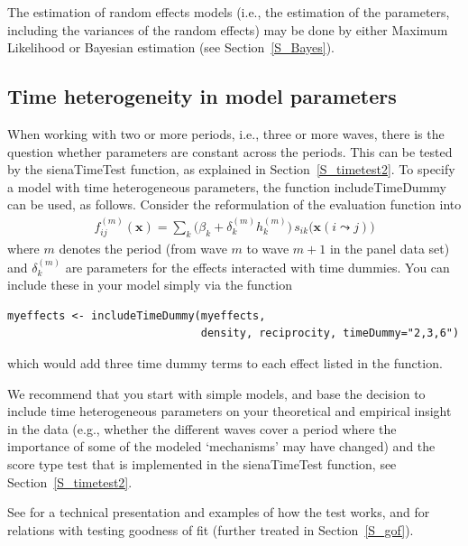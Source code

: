 \documentclass[a4paper,fleqn,11pt]{article}
\newcommand{\+}{\, + \,}
\newcommand{\sfn}[1]{\textsf{#1}}
\begin{document}
The estimation of random effects models
(i.e., the estimation of the parameters,
including the variances of the random effects)
may be done by either Maximum Likelihood
or Bayesian estimation (see Section~\ref{S_Bayes}).

\fi

\subsection{Time heterogeneity in model parameters}
\label{S_timetest1}

When working with two or more periods, i.e., three or more waves,
there is the question whether parameters are constant across the periods.
This can be tested by the \sfn{sienaTimeTest} function, as explained
in Section~\ref{S_timetest2}.
To specify a model with time heterogeneous parameters, the function
\sfn{includeTimeDummy} can be used, as follows.
Consider the reformulation of the evaluation function into
\begin{align}
f^{(m)}_{ij}(\mathbf{x})= \sum_k \Big(\beta_k + \delta_k^{(m)} h_k^{(m)}\Big)
                              \,      s_{ik}\big(\mathbf{x}(i \leadsto j)\big)
\label{eq:fmij}
\end{align}
where $m$ denotes the period (from wave $m$ to wave $m+1$
in the panel data set)
and $\delta_k^{(m)}$ are parameters for the effects interacted
with time dummies. You
can include these in your model simply via the function
\begin{verbatim}
myeffects <- includeTimeDummy(myeffects,
                              density, reciprocity, timeDummy="2,3,6")
\end{verbatim}
which would add three time dummy terms to each effect listed in the function.

We recommend that you start with simple models,
and base the decision to include time heterogeneous parameters
on your theoretical and empirical insight in the data
(e.g., whether the different waves cover a period where the importance
of some of the modeled `mechanisms' may have changed) and
the score type test that is implemented in the \sfn{sienaTimeTest} function,
see Section~\ref{S_timetest2}.

See \citet{Lospinoso2011} for a technical presentation
and examples of how the test works,
and \citet{LospinosoSnijders2019} for relations with
testing goodness of fit (further treated in Section~\ref{S_gof}).
\end{document}
